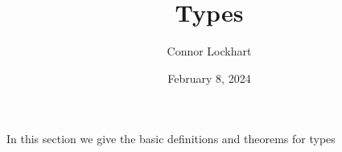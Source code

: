 \documentclass[a4paper]{article}
\title{Types}
\date{February 8, 2024}
\author{Connor Lockhart}
\begin{document}
\maketitle
\par{In this section we give the basic definitions and theorems for types}
\printbibliography
\end{document}
